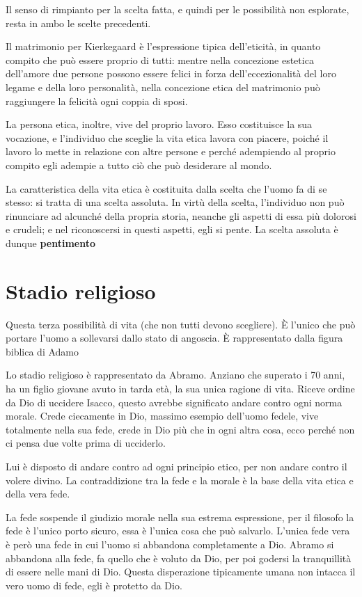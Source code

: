 \documentclass[a4paper, twoside, titlepage]{book}
\begin{document}
Il senso di rimpianto per la scelta fatta, e quindi per le possibilità non esplorate, resta in ambo le scelte precedenti.

Il matrimonio per Kierkegaard è l'espressione tipica dell'eticità, in quanto compito che può essere proprio di tutti: mentre nella concezione estetica dell'amore due persone possono essere felici in forza dell'eccezionalità del loro legame e della loro personalità, nella concezione etica del matrimonio può raggiungere la felicità ogni coppia di sposi.

La persona etica, inoltre, vive del proprio lavoro. Esso costituisce la sua vocazione, e l'individuo che sceglie la vita etica lavora con piacere, poiché il lavoro lo mette in relazione con altre persone e perché adempiendo al proprio compito egli adempie a tutto ciò che può desiderare al mondo.

La caratteristica della vita etica è costituita dalla scelta che l'uomo fa di se stesso: si tratta di una scelta assoluta.
In virtù della scelta, l'individuo non può rinunciare ad alcunché della propria storia, neanche gli aspetti di essa più dolorosi e crudeli; e nel riconoscersi in questi aspetti, egli si pente. La scelta assoluta è dunque \textbf{pentimento}

\section{Stadio religioso}

Questa terza possibilità di vita (che non tutti devono scegliere).
È l'unico che può portare l'uomo a sollevarsi dallo stato di angoscia.
È rappresentato dalla figura biblica di Adamo

Lo stadio religioso è rappresentato da Abramo. Anziano che superato i 70 anni, ha un figlio giovane avuto in tarda età, la sua unica ragione di vita. Riceve ordine da Dio di uccidere Isacco, questo avrebbe significato andare contro ogni norma morale. Crede ciecamente in Dio, massimo esempio dell’uomo fedele, vive totalmente nella sua fede, crede in Dio più che in ogni altra cosa, ecco perché non ci pensa due volte prima di ucciderlo.

Lui è disposto di andare contro ad ogni principio etico, per non andare contro il volere divino. La contraddizione tra la fede e la morale è la base della vita etica e della vera fede.

La fede sospende il giudizio morale nella sua estrema espressione, per il filosofo la fede è l’unico porto sicuro, essa è l’unica cosa che può salvarlo. L’unica fede vera è però una fede in cui l’uomo si abbandona completamente a Dio. Abramo si abbandona alla fede, fa quello che è voluto da Dio, per poi godersi la tranquillità di essere nelle mani di Dio. Questa disperazione tipicamente umana non intacca il vero uomo di fede, egli è protetto da Dio.
\end{document}
